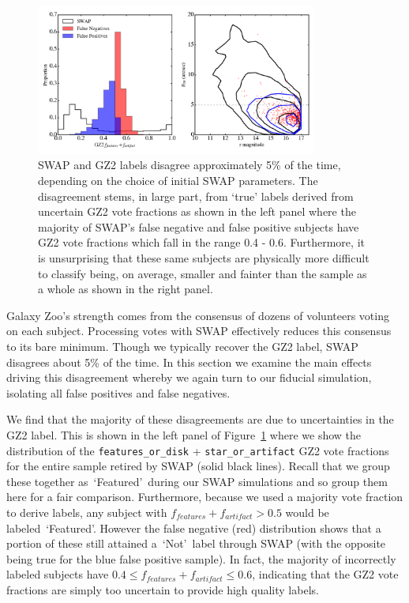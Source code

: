 \documentclass[twocolumn]{aastex6}
\newcommand{\feat}{`Featured'}
\newcommand{\notfeat}{`Not'}
\begin{document}
\begin{figure}[t!]
\includegraphics[width=3.65in]{figures/swapgetsitwrong_test.png}
\caption{SWAP and GZ2 labels disagree approximately 5\% of the time, depending on the choice
of initial SWAP parameters. The disagreement stems, in large part, from `true' labels derived from uncertain GZ2 vote fractions as shown in the left panel where the  majority of SWAP's false negative and false positive subjects have GZ2 vote fractions which fall in the range 0.4 - 0.6. Furthermore, it is unsurprising that these same subjects are physically more difficult to classify being, on average, smaller and fainter than the sample as a whole as shown in the right panel. \label{fig: SWAP sucks}}
\end{figure}

Galaxy Zoo's strength comes from the consensus of dozens of volunteers voting on each subject. 
Processing votes with SWAP effectively reduces this consensus to its bare minimum. 
Though we typically recover the GZ2 label, SWAP disagrees about 5\% of the time. 
In this section we examine the main effects driving this disagreement whereby we again
 turn to our fiducial simulation, isolating all false positives and false negatives. 

We find that the majority of these disagreements are due to uncertainties in the GZ2
label. This is shown in the left panel of Figure~\ref{fig: SWAP sucks} where we show
the distribution of the \texttt{features\_or\_disk} + \texttt{star\_or\_artifact} GZ2 vote 
fractions for the entire sample retired by SWAP (solid black lines). 
Recall that we group these together as~\feat~during  our SWAP simulations and so 
group them here for a fair comparison. Furthermore, because we used a majority vote
fraction to derive labels, any subject with $ f_{features}+f_{artifact} > 0.5$ would be
labeled~\feat.  However the false negative (red) distribution shows that a portion 
of these still attained a~\notfeat~label through SWAP (with the opposite being 
true for the blue false positive sample). In fact, the majority of incorrectly labeled 
subjects have $0.4 \le f_{features}+f_{artifact} \le 0.6$,
indicating that the GZ2 vote fractions are simply too uncertain to provide high quality labels. 
\end{document}
